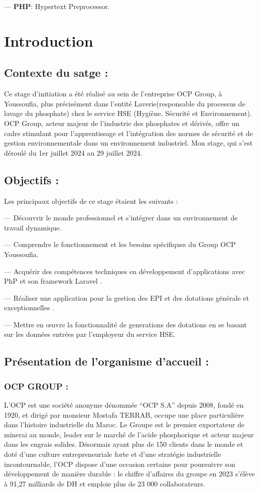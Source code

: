 \documentclass[a4paper,12pt]{report}
\begin{document}
     — \textbf{PHP}: Hypertext Preprocessor.

\chapter*{Introduction}
\section{Contexte du satge :}
Ce stage d’initiation a été réalisé au sein de l’entreprise OCP Group, à Youssoufia, plus précisément dans l’entité Laverie(responsable du processus de lavage du phosphate) chez le service HSE (Hygiène, Sécurité et Environnement). OCP Group, acteur majeur de l'industrie des phosphates et dérivés, offre un cadre stimulant pour l'apprentissage et l'intégration des normes de sécurité et de gestion environnementale dans un environnement industriel. Mon stage, qui s'est déroulé du 1er juillet 2024 au 29 juillet 2024.
\section{Objectifs :}
 Les principaux objectifs de ce stage étaient les suivants :
 
 — Découvrir le monde professionnel et s’intégrer dans un environnement de travail
 dynamique.
 
 — Comprendre le fonctionnement et les besoins spécifiques du Group OCP Youssoufia.
 
 — Acquérir des compétences techniques en développement d’applications avec PhP et son framework Laravel .
 
 — Réaliser une application pour la gestion des EPI et des dotations générale et  exceptionnelles .

 — Mettre en œuvre la fonctionnalité de generations des dotations en se basant sur les 
 données entrées par l'employeur du service HSE.
\section{Présentation de l'organisme d'accueil :}
\subsection{OCP GROUP :}
L’OCP est une société anonyme dénommée “OCP S.A” depuis 2008, fondé en 1920, et dirigé par monsieur Mostafa TERRAB, occupe une place particulière dans l’histoire industrielle du Maroc. Le Groupe est le premier exportateur de minerai au monde, leader sur le marché de l’acide phosphorique et acteur majeur dans les engrais solides.
Désormais ayant plus de 150 clients dans le monde et doté d’une culture
entrepreneuriale forte et d’une stratégie industrielle incontournable, l’OCP dispose d’une occasion certaine pour poursuivre son développement de manière durable : le chiffre d’affaires du groupe en 2023 s’élève à 91,27 milliards de DH et emploie plus de 23 000 collaborateurs.
\end{document}
